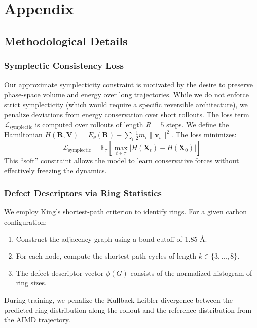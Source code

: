\documentclass{article}
\begin{document}
\nocite{*}



\newpage
\appendix
\section{Appendix}

\subsection{Methodological Details}

\subsubsection{Symplectic Consistency Loss}
Our approximate symplecticity constraint is motivated by the desire to preserve phase-space volume and energy over long trajectories. While we do not enforce strict symplecticity (which would require a specific reversible architecture), we penalize deviations from energy conservation over short rollouts. 
The loss term $\mathcal{L}_\text{symplectic}$ is computed over rollouts of length $R=5$ steps. We define the Hamiltonian $H(\mathbf{R}, \mathbf{V}) = E_\theta(\mathbf{R}) + \sum_i \frac{1}{2} m_i \|\mathbf{v}_i\|^2$. The loss minimizes:
\begin{equation}
    \mathcal{L}_\text{symplectic} = \mathbb{E}_{\tau} \left[ \max_{t \in \tau} |H(\mathbf{X}_t) - H(\mathbf{X}_0)| \right]
\end{equation}
This ``soft'' constraint allows the model to learn conservative forces without effectively freezing the dynamics.

\subsubsection{Defect Descriptors via Ring Statistics}
We employ King's shortest-path criterion to identify rings. For a given carbon configuration:
\begin{enumerate}
    \item Construct the adjacency graph using a bond cutoff of 1.85 \AA{}.
    \item For each node, compute the shortest path cycles of length $k \in \{3, \dots, 8\}$.
    \item The defect descriptor vector $\phi(G)$ consists of the normalized histogram of ring sizes.
\end{enumerate}
During training, we penalize the Kullback-Leibler divergence between the predicted ring distribution along the rollout and the reference distribution from the AIMD trajectory.
\end{document}
